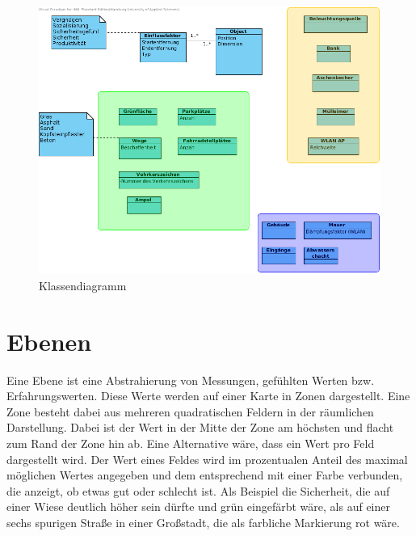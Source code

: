 \documentclass[10pt]{scrartcl}
\begin{document}
	\begin{figure}[H]
    	\label{fig:fachlichesDatenmodellUebersicht}
			\includegraphics[width=\textwidth]{img/ClassDiagram.png}
            \caption{Klassendiagramm}
             \label{img:classDiagram}
	\end{figure} 	
	
\section{Ebenen}\label{sec:Ebenen}
Eine Ebene ist eine Abstrahierung von Messungen, gefühlten Werten bzw. Erfahrungswerten. Diese Werte werden auf einer Karte in Zonen dargestellt. Eine Zone besteht dabei aus mehreren quadratischen Feldern in der räumlichen Darstellung. Dabei ist der Wert in der Mitte der Zone am höchsten und flacht zum Rand der Zone hin ab. Eine Alternative wäre, dass ein Wert pro Feld dargestellt wird.
\newline Der Wert eines Feldes wird im prozentualen Anteil des maximal möglichen Wertes angegeben und dem entsprechend mit einer Farbe verbunden, die anzeigt, ob etwas gut oder schlecht ist. Als Beispiel die Sicherheit, die auf einer Wiese deutlich höher sein dürfte und grün eingefärbt wäre, als auf einer sechs spurigen Straße in einer Großstadt, die als farbliche Markierung rot wäre.
\end{document}
